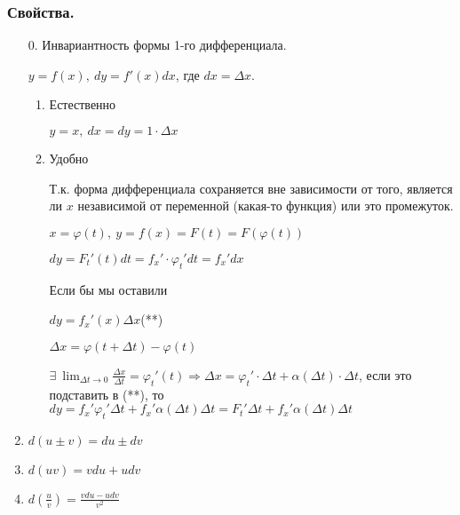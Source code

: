 \documentclass{article}
\begin{document}
    \subsubsection{Свойства.}

    \begin{enumerate}
        \item[\(0\).] Инвариантность формы 1-го дифференциала.
        
        \( y = f(x),\ dy = f'(x)dx \), где \( dx = \Delta x \).

        \begin{enumerate}
            \item Естественно
            
            \( y = x,\ dx = dy = 1\cdot \Delta x \)
            
            \item Удобно 
            
            Т.к. форма дифференциала сохраняется вне зависимости от того, является ли \(x\) независимой от переменной (какая-то функция) или это промежуток.

            \( x = \varphi(t),\ y = f(x) = F(t) = F(\varphi(t)) \)

            \( dy = F_t'(t)dt = f_x' \cdot \varphi_t'dt = f_x'dx \)

            Если бы мы оставили 

            \( dy = f_x'(x)\Delta x \)(**)

            \( \Delta x = \varphi(t + \Delta t) - \varphi(t) \)

            \( \exists\ \lim_{\Delta t \to 0}\frac{\Delta x}{\Delta t} = \varphi_t'(t) \Rightarrow \Delta x = \varphi_t' \cdot \Delta t + \alpha(\Delta t)\cdot\Delta t \), если это подставить в (**), то \( dy = f_x'\varphi_t'\Delta t + f_x'\alpha(\Delta t)\Delta t = F_t'\Delta t + f_x'\alpha(\Delta t)\Delta t \)

        \end{enumerate}

        \item \( d(u \pm v) = du \pm dv \)
        \item \( d(uv) = vdu + udv \) 
        \item \( d(\frac{u}{v}) = \frac{vdu - udv}{v^2} \)


    \end{enumerate}
\end{document}
